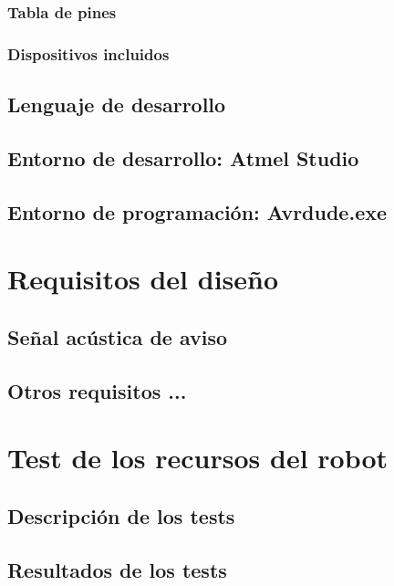 \documentclass[a4paper]{article}
\begin{document}
		\subsubsection{Tabla de pines}
		
		\subsubsection{Dispositivos incluidos}

	\subsection{Lenguaje de desarrollo}
	
	\subsection{Entorno de desarrollo: Atmel Studio}
	
	\subsection{Entorno de programación: Avrdude.exe}
	
\section{Requisitos del diseño}

	\subsection{Señal acústica de aviso}
	
	\subsection{Otros requisitos ...}

\section{Test de los recursos del robot}

	\subsection{Descripción de los tests}
	
	\subsection{Resultados de los tests}
\end{document}

